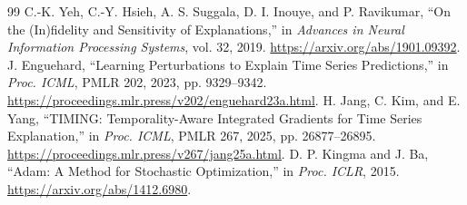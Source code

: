 \documentclass[conference]{IEEEtran}
\begin{document}
\begin{thebibliography}{99}
 C.-K. Yeh, C.-Y. Hsieh, A. S. Suggala, D. I. Inouye, and P. Ravikumar, ``On the (In)fidelity and Sensitivity of Explanations,'' in \emph{Advances in Neural Information Processing Systems}, vol. 32, 2019. \url{https://arxiv.org/abs/1901.09392}.
 J. Enguehard, ``Learning Perturbations to Explain Time Series Predictions,'' in \emph{Proc. ICML}, PMLR 202, 2023, pp. 9329--9342. \url{https://proceedings.mlr.press/v202/enguehard23a.html}.
 H. Jang, C. Kim, and E. Yang, ``TIMING: Temporality-Aware Integrated Gradients for Time Series Explanation,'' in \emph{Proc. ICML}, PMLR 267, 2025, pp. 26877--26895. \url{https://proceedings.mlr.press/v267/jang25a.html}.
 D. P. Kingma and J. Ba, ``Adam: A Method for Stochastic Optimization,'' in \emph{Proc. ICLR}, 2015. \url{https://arxiv.org/abs/1412.6980}.
\end{thebibliography}
\end{document}
